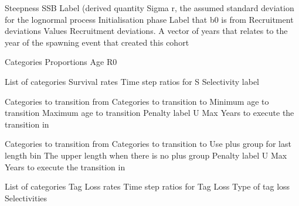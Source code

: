  {Steepness}
 {SSB Label (derived quantity}
 {Sigma r, the assumed standard deviation for the lognormal process}
 {Initialisation phase Label that b0 is from}
 {Recruitment deviations Values}
 {Recruitment deviations. A vector of years that relates to the year of the spawning event that created this cohort}
\par\textbf{}\par
{} {Categories}
 {Proportions}
 {Age}
 {R0}
\par\textbf{}\par
{} {List of categories}
 {Survival rates}
 {Time step ratios for S}
 {Selectivity label}
\par\textbf{}\par
{} {Categories to transition from}
 {Categories to transition to}
 {Minimum age to transition}
 {Maximum age to transition}
 {Penalty label}
 {U Max}
 {Years to execute the transition in}
 {}
 {}
 {}
 {}
 {}
 {}
\par\textbf{}\par
{} {Categories to transition from}
 {Categories to transition to}
 {Use plus group for last length bin}
 {The upper length when there is no plus group}
 {Penalty label}
 {U Max}
 {Years to execute the transition in}
 {}
 {}
 {}
 {}
\par\textbf{}\par
{} {List of categories}
 {Tag Loss rates}
 {Time step ratios for Tag Loss}
 {Type of tag loss}
 {Selectivities}
